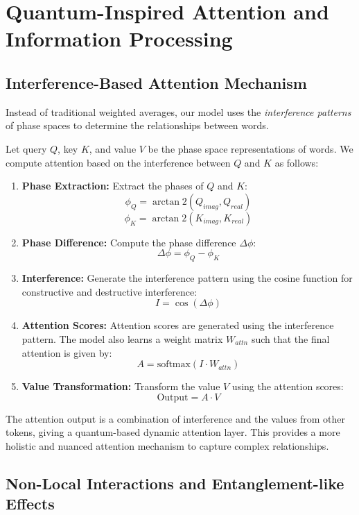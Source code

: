 \documentclass[11pt, a4paper]{article}
\begin{document}
\section{Quantum-Inspired Attention and Information Processing}

\subsection{Interference-Based Attention Mechanism}

Instead of traditional weighted averages, our model uses the \textit{interference patterns} of phase spaces to determine the relationships between words.

Let query $Q$, key $K$, and value $V$ be the phase space representations of words. We compute attention based on the interference between $Q$ and $K$ as follows:

\begin{enumerate}
    \item \textbf{Phase Extraction:} Extract the phases of $Q$ and $K$:
        $$
        \phi_Q = \arctan2(Q_{imag}, Q_{real})
        $$
        $$
        \phi_K = \arctan2(K_{imag}, K_{real})
        $$
    \item \textbf{Phase Difference:} Compute the phase difference $\Delta\phi$:
        $$
        \Delta\phi = \phi_Q - \phi_K
        $$
    \item \textbf{Interference:} Generate the interference pattern using the cosine function for constructive and destructive interference:
        $$
        I = \cos(\Delta\phi)
        $$
    \item \textbf{Attention Scores:} Attention scores are generated using the interference pattern. The model also learns a weight matrix $W_{attn}$ such that the final attention is given by:
        $$
        A = \text{softmax}(I \cdot W_{attn})
        $$
    \item \textbf{Value Transformation:} Transform the value $V$ using the attention scores:
        $$
        \text{Output} = A \cdot V
        $$
\end{enumerate}

The attention output is a combination of interference and the values from other tokens, giving a quantum-based dynamic attention layer. This provides a more holistic and nuanced attention mechanism to capture complex relationships.

\subsection{Non-Local Interactions and Entanglement-like Effects}
\end{document}
